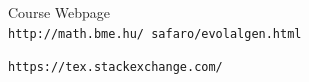 \documentclass[12pt,english]{article}
\begin{document}
\begin{thebibliography}{9}

Course Webpage
\\\texttt{http://math.bme.hu/~safaro/evolalgen.html}


\texttt{https://tex.stackexchange.com/}


\end{thebibliography}
\end{document}
